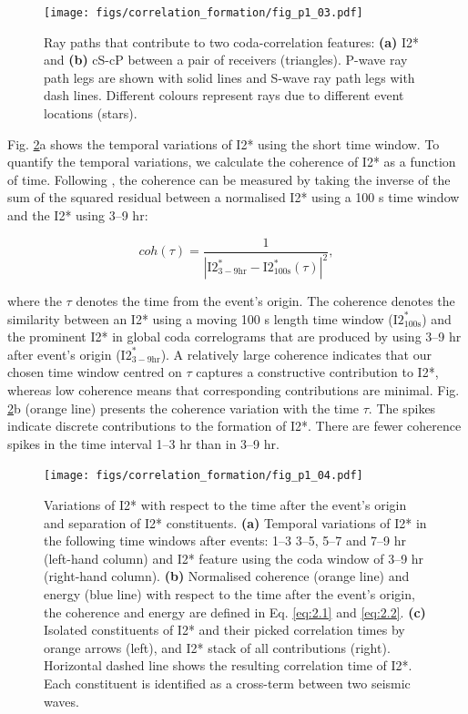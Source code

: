 \begin{figure}[!hbt]
	\centering
	\texttt{[image: figs/correlation\_formation/fig\_p1\_03.pdf]}
	\caption[Ray paths of constituents for correlation features I2* and cS-cP]
    {
		Ray paths that contribute to two coda-correlation features: \textbf{(a)} I2* and \textbf{(b)} cS-cP between a pair of receivers (triangles). P-wave ray path legs are shown with solid lines and S-wave ray path legs with dash lines. Different colours represent rays due to different event locations (stars).
	}
	\label{fig:2.3}
\end{figure}


Fig. \ref{fig:2.4}a shows the temporal variations of I2* using the short time window. To quantify the temporal variations, we calculate the coherence of I2* as a function of time. Following \citet{rawlinson_rapid_2004}, the coherence can be measured by taking the inverse of the sum of the squared residual between a normalised I2* using a 100 s time window and the I2* using 3--9 hr:


\begin{equation}\label{eq:2.1}
    coh(\tau) = \frac{1}{|\text{I2}^*_{3-9\text{hr}}-\text{I2}^*_{100\text{s}}(\tau)|^2},
\end{equation}

where the $\tau$ denotes the time from the event's origin. The coherence denotes the similarity between an I2* using a moving 100 s length time window ($\text{I2}^*_{100\text{s}}$) and the prominent I2* in global coda correlograms that are produced by using 3--9 hr after event's origin ($\text{I2}^*_{3-9\text{hr}}$). A relatively large coherence indicates that our chosen time window centred on $\tau$ captures a constructive contribution to I2*, whereas low coherence means that corresponding contributions are minimal. Fig. \ref{fig:2.4}b (orange line) presents the coherence variation with the time $\tau$. The spikes indicate discrete contributions to the formation of I2*. There are fewer coherence spikes in the time interval 1--3 hr than in 3--9 hr.

\begin{figure}[!hbt]
	\centering
	\texttt{[image: figs/correlation\_formation/fig\_p1\_04.pdf]}
	\caption[Separation of the I2* constituents]
    {
		Variations of I2* with respect to the time after the event's origin and separation of I2* constituents. \textbf{(a)} Temporal variations of I2* in the following time windows after events: 1--3 3--5, 5--7 and 7--9 hr (left-hand column) and I2* feature using the coda window of 3--9 hr (right-hand column). \textbf{(b)} Normalised coherence (orange line) and energy (blue line) with respect to the time after the event's origin, the coherence and energy are defined in Eq. \ref{eq:2.1} and \ref{eq:2.2}. \textbf{(c)} Isolated constituents of I2* and their picked correlation times by orange arrows (left), and I2* stack of all contributions (right). Horizontal dashed line shows the resulting correlation time of I2*. Each constituent is identified as a cross-term between two seismic waves.
	}
	\label{fig:2.4}
\end{figure}


